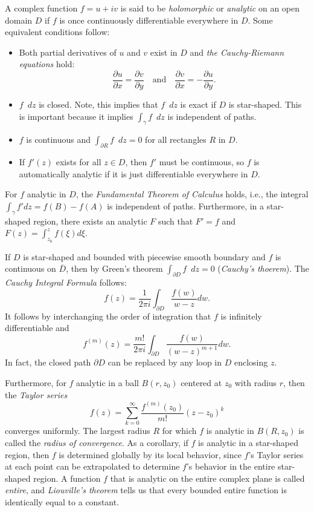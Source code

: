 \documentclass[12pt]{article}
\begin{document}
A complex function $f=u+iv$ is said to be {\it holomorphic} or 
{\it analytic} on an open
domain $D$ if $f$ is once continuously differentiable everywhere in $D$.
Some equivalent conditions follow:
\begin{itemize}
	\item Both partial derivatives of $u$ and $v$ exist in $D$ and
		{\it the Cauchy-Riemann equations} hold:
		$$
		\frac{\partial u}{\partial x}=\frac{\partial v}{\partial y}
		\quad\text{and}\quad
		\frac{\partial v}{\partial x}=-\frac{\partial u}{\partial y}.
		$$
	\item $f$~$dz$ is closed. Note, this implies that $f$~$dz$ is exact
		if $D$ is star-shaped. This is important because it implies
		$\int_\gamma f$~$dz$ is independent of paths.
	\item $f$ is continuous and $\int_{\partial R}f$~$dz=0$ for all
		rectangles $R$ in $D$.
	\item If $f'(z)$ exists for all $z\in D$, then $f'$ must be
		continuous, so $f$ is automatically analytic if it is
		just differentiable everywhere in $D$.
\end{itemize}

For $f$ analytic in $D$, the {\it Fundamental Theorem of Calculus} holds,
i.e., the integral $\int_\gamma f' dz = f(B) - f(A)$ is independent of paths.
Furthermore, in a star-shaped region, there exists an analytic $F$ such
that $F'=f$ and $F(z) = \int_{z_0}^z f(\xi)d\xi$.

If $D$ is star-shaped and bounded with piecewise smooth boundary and $f$
is continuous on ${\overline D}$, then by Green's theorem
$\int_{\partial D} f$~$dz = 0$ ({\it Cauchy's thoerem}). The
{\it Cauchy Integral Formula} follows:
$$
f(z) = \frac{1}{2\pi i} \int_{\partial D}\frac{f(w)}{w-z} dw.
$$
It follows by interchanging the order of integration that $f$ is infinitely
differentiable and
$$
f^{(m)}(z) = \frac{m!}{2\pi i}\int_{\partial D} \frac{f(w)}{(w-z)^{m+1}} dw.
$$
In fact, the closed path $\partial D$ can be replaced by any loop in
$D$ enclosing $z$.

Furthermore, for $f$ analytic in a ball $B(r,z_0)$ centered at $z_0$ with
radius $r$, then the {\it Taylor series}
$$f(z) = \sum_{k=0}^\infty \frac{f^{(m)}(z_0)}{m!}(z-z_0)^k$$
converges uniformly.
The largest radius $R$ for which $f$ is analytic in $B(R,z_0)$ is called the 
{\it radius of convergence}.
As a corollary, if $f$ is analytic in a star-shaped region, then $f$ is
determined globally by its local behavior, since $f$'s Taylor series at
each point can be extrapolated to determine $f$'s behavior in the entire
star-shaped region.
A function $f$ that is analytic on the entire complex plane is called
{\it entire}, and {\it Liouville's theorem} tells us that every bounded
entire function is identically equal to a constant.
\end{document}
